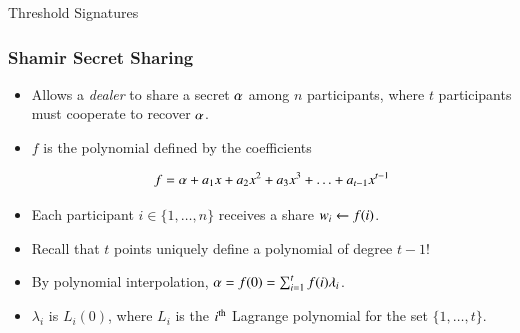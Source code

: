 \documentclass[hyperref={pdfpagelabels=true},table,dvipsnames,14pt,aspectratio=169]{beamer}
\begin{document}
\begin{frame}
  \centering
\scalebox{0.9} {
}
\end{frame}


\begin{frame}
  \huge 
  Threshold Signatures
\end{frame}

\begin{frame}
  \frametitle{Shamir Secret Sharing}

  \begin{itemize}
    \item<1-> Allows a \emph{dealer} to share a secret $\alpha$ among $n$ participants, where $t$ participants must cooperate to recover $\alpha$.
    \item<2-> $f$ is the polynomial defined by the coefficients

      \[f = \alpha + a_1 x + a_2 x^2 + a_3 x^3 + \ldots + a_{t-1}x^{t-1}  \]

    \item<3-> Each participant $i \in \{1, \ldots, n \}$ receives a share $w_i \gets f(i) $.
    \item<4-> Recall that $t$ points uniquely define a polynomial of degree $t-1$!
    \item<5-> By polynomial interpolation, $\alpha = f(0) = \sum_{i=1}^t f(i) \lambda_i$.
    \item<6-> $\lambda_i$ is $L_i(0)$, where $L_i$ is the $i^{\textrm{\scriptsize th}}$ Lagrange polynomial for the set $\{1, \ldots, t \}$.
  \end{itemize}
\end{frame}
\end{document}
